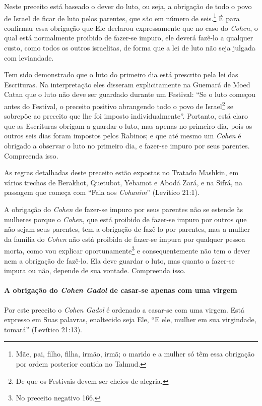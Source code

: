 Neste preceito está baseado o dever do luto, ou seja, a obrigação de
todo o povo de Israel de ficar de luto pelos parentes, que são em número
de seis.\footnote{Mãe, pai, filho, filha, irmão, irmã; o marido e a mulher só têm essa
  obrigação por ordem posterior contida no Talmud.} É para confirmar essa obrigação que Ele
declarou expressamente que no caso do \textit{Cohen}, o qual está normalmente proibido de fazer-se impuro, ele deverá fazê-lo a qualquer custo, como todos os outros israelitas, de forma que a lei de luto não seja julgada com leviandade.

Tem sido demonstrado que o luto do primeiro dia está prescrito pela lei
das Escrituras. Na interpretação eles disseram explicitamente na Guemará
de Moed Catan que o luto não deve ser guardado durante um Festival: ``Se
o luto começou antes do Festival, o preceito positivo abrangendo todo o
povo de Israel\footnote{De que os Festivais devem ser cheios de alegria.} se sobrepõe ao preceito que lhe foi
imposto individualmente''. Portanto, está claro que as Escrituras obrigam a guardar o luto, mas apenas no primeiro dia, pois os outros seis dias foram impostos pelos Rabinos; e que
até mesmo um \textit{Cohen} é obrigado a observar o luto no primeiro dia, e
fazer-se impuro por seus parentes. Compreenda isso.

As regras detalhadas deste preceito estão expostas no Tratado Mashkin, em vários trechos de Berakhot, Quetubot, Yebamot e Abodá Zará, e
na Sifrá, na passagem que começa com ``Fala aos \textit{Cohanim}'' (Levítico
21:1).

A obrigação do \textit{Cohen} de fazer-se impuro por seus parentes não se
estende às mulheres porque o \textit{Cohen}, que está proibido de fazer-se
impuro por outros que não sejam seus parentes, tem a obrigação de
fazê-lo por parentes, mas a mulher da família do \textit{Cohen} não está proibida de
fazer-se impura por qualquer pessoa morta, como vou explicar
oportunamente\footnote{No preceito negativo 166.} e consequentemente não tem o dever nem a obrigação de fazê-lo. Ela deve guardar
o luto, mas quanto a fazer-se impura ou não, depende de sua vontade.
Compreenda isso.

\paragraph{A obrigação do \textit{Cohen Gadol} de casar-se apenas com uma virgem}

Por este preceito o \textit{Cohen Gadol} é ordenado a casar-se com uma
virgem. Está expresso em Suas palavras, enaltecido seja Ele, ``E ele,
mulher em sua virgindade, tomará'' (Levítico 21:13).


